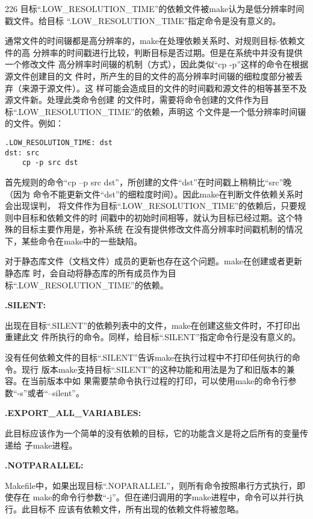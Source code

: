 \begin{dinglist}{226}
目标“.LOW\_RESOLUTION\_TIME”的依赖文件被make认为是低分辨率时间戳文件。给目标
“.LOW\_RESOLUTION\_TIME”指定命令是没有意义的。

通常文件的时间辍都是高分辨率的，make在处理依赖关系时、对规则目标-依赖文件的高
分辨率的时间戳进行比较，判断目标是否过期。但是在系统中并没有提供一个修改文件
高分辨率时间辍的机制（方式），因此类似“cp -p”这样的命令在根据源文件创建目的文
件时，所产生的目的文件的高分辨率时间辍的细粒度部分被丢弃（来源于源文件）。这
样可能会造成目的文件的时间戳和源文件的相等甚至不及源文件新。处理此类命令创建
的文件时，需要将命令创建的文件作为目标“.LOW\_RESOLUTION\_TIME”的依赖，声明这
个文件是一个低分辨率时间辍的文件。例如：

\begin{Verbatim}[]
.LOW_RESOLUTION_TIME: dst
dst: src
    cp -p src dst
\end{Verbatim}

首先规则的命令“cp –p src dst”，所创建的文件“dst”在时间戳上稍稍比“src”晚（因为
命令不能更新文件“dst”的细粒度时间）。因此make在判断文件依赖关系时会出现误判，
将文件作为目标“.LOW\_RESOLUTION\_TIME”的依赖后，只要规则中目标和依赖文件的时
间戳中的初始时间相等，就认为目标已经过期。这个特殊的目标主要作用是，弥补系统
在没有提供修改文件高分辨率时间戳机制的情况下，某些命令在make中的一些缺陷。

对于静态库文件（文档文件）成员的更新也存在这个问题。make在创建或者更新静态库
时，会自动将静态库的所有成员作为目标“.LOW\_RESOLUTION\_TIME”的依赖。

\item \textbf{.SILENT:}

出现在目标“.SILENT”的依赖列表中的文件，make在创建这些文件时，不打印出重建此文
件所执行的命令。同样，给目标“.SILENT”指定命令行是没有意义的。

没有任何依赖文件的目标“.SILENT”告诉make在执行过程中不打印任何执行的命令。现行
版本make支持目标“.SILENT”的这种功能和用法是为了和旧版本的兼容。在当前版本中如
果需要禁命令执行过程的打印，可以使用make的命令行参数“-s”或者“--silent”。

\item \textbf{.EXPORT\_ALL\_VARIABLES:}

此目标应该作为一个简单的没有依赖的目标，它的功能含义是将之后所有的变量传递给
子make进程。

\item \textbf{.NOTPARALLEL:}

Makefile中，如果出现目标“.NOPARALLEL”，则所有命令按照串行方式执行，即使存在
make的命令行参数“-j”。但在递归调用的字make进程中，命令可以并行执行。此目标不
应该有依赖文件，所有出现的依赖文件将被忽略。

\end{dinglist}

